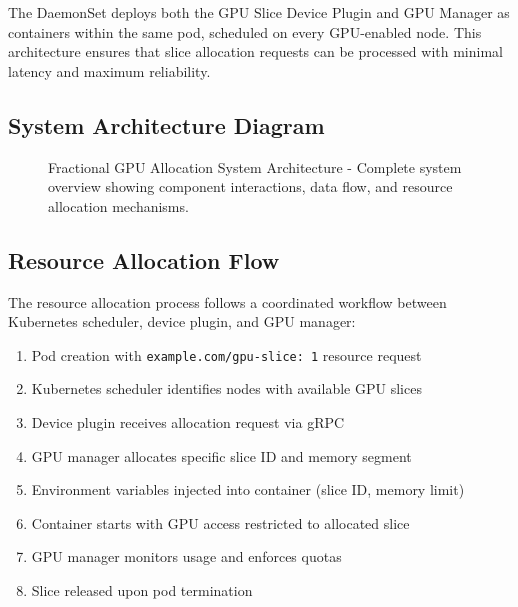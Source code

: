 \documentclass[10pt,twocolumn,letterpaper]{article}
\begin{document}
The DaemonSet deploys both the GPU Slice Device Plugin and GPU Manager as containers within the same pod, scheduled on every GPU-enabled node. This architecture ensures that slice allocation requests can be processed with minimal latency and maximum reliability.

\subsection{System Architecture Diagram}

\begin{figure}[!htb]
\centering
{}
\caption{Fractional GPU Allocation System Architecture - Complete system overview showing component interactions, data flow, and resource allocation mechanisms.}
\label{fig:architecture}
\end{figure}

\subsection{Resource Allocation Flow}

The resource allocation process follows a coordinated workflow between Kubernetes scheduler, device plugin, and GPU manager:

\begin{enumerate}
\item Pod creation with \texttt{example.com/gpu-slice: 1} resource request
\item Kubernetes scheduler identifies nodes with available GPU slices
\item Device plugin receives allocation request via gRPC
\item GPU manager allocates specific slice ID and memory segment
\item Environment variables injected into container (slice ID, memory limit)
\item Container starts with GPU access restricted to allocated slice
\item GPU manager monitors usage and enforces quotas
\item Slice released upon pod termination
\end{enumerate}
\end{document}
